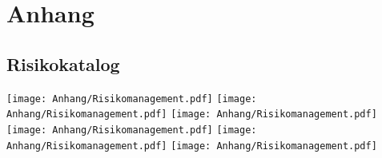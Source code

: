 \documentclass[a4paper,10pt,fleqn]{article} %
\begin{document}
    
    \begin{flushleft}
        \setlength{}
        \renewcommand{\refname}{Literatur- und Quellenverzeichnis}
        {} %
    \end{flushleft}
    \appendix      
   	\begin{appendix}
   		\clearpage
   		\section{Anhang}
   		
   		
   		
   		
   		
   		
   		
   			
   		
   		
   		\begin{landscape}
   			\section{Risikokatalog}
   			\texttt{[image: Anhang/Risikomanagement.pdf]}
   			\newpage  			
   			\texttt{[image: Anhang/Risikomanagement.pdf]}
   			\newpage  			
   			\texttt{[image: Anhang/Risikomanagement.pdf]}
   			\newpage  			
   			\texttt{[image: Anhang/Risikomanagement.pdf]}
   			\newpage  			
   			\texttt{[image: Anhang/Risikomanagement.pdf]}	
   			\newpage  			
   			\texttt{[image: Anhang/Risikomanagement.pdf]}	
   		\end{landscape} 
   		
   	\end{appendix}  
\end{document}
